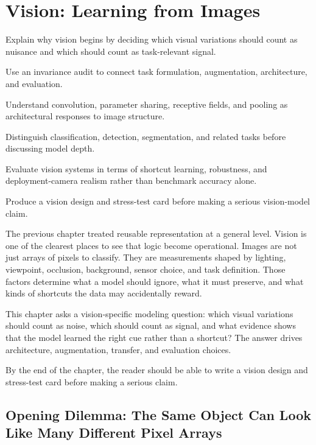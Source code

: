 \chapter{Vision: Learning from Images}

\begin{learninggoals}
\item Explain why vision begins by deciding which visual variations should count as nuisance and which should count as task-relevant signal.
\item Use an invariance audit to connect task formulation, augmentation, architecture, and evaluation.
\item Understand convolution, parameter sharing, receptive fields, and pooling as architectural responses to image structure.
\item Distinguish classification, detection, segmentation, and related tasks before discussing model depth.
\item Evaluate vision systems in terms of shortcut learning, robustness, and deployment-camera realism rather than benchmark accuracy alone.
\item Produce a vision design and stress-test card before making a serious vision-model claim.
\end{learninggoals}

The previous chapter treated reusable representation at a general level. Vision is one of the clearest places to see that logic become operational. Images are not just arrays of pixels to classify. They are measurements shaped by lighting, viewpoint, occlusion, background, sensor choice, and task definition. Those factors determine what a model should ignore, what it must preserve, and what kinds of shortcuts the data may accidentally reward.

\begin{problemsolvinglens}
This chapter asks a vision-specific modeling question: which visual variations should count as noise, which should count as signal, and what evidence shows that the model learned the right cue rather than a shortcut? The answer drives architecture, augmentation, transfer, and evaluation choices.
\end{problemsolvinglens}

By the end of the chapter, the reader should be able to write a vision design and stress-test card before making a serious claim.

\section{Opening Dilemma: The Same Object Can Look Like Many Different Pixel Arrays}

